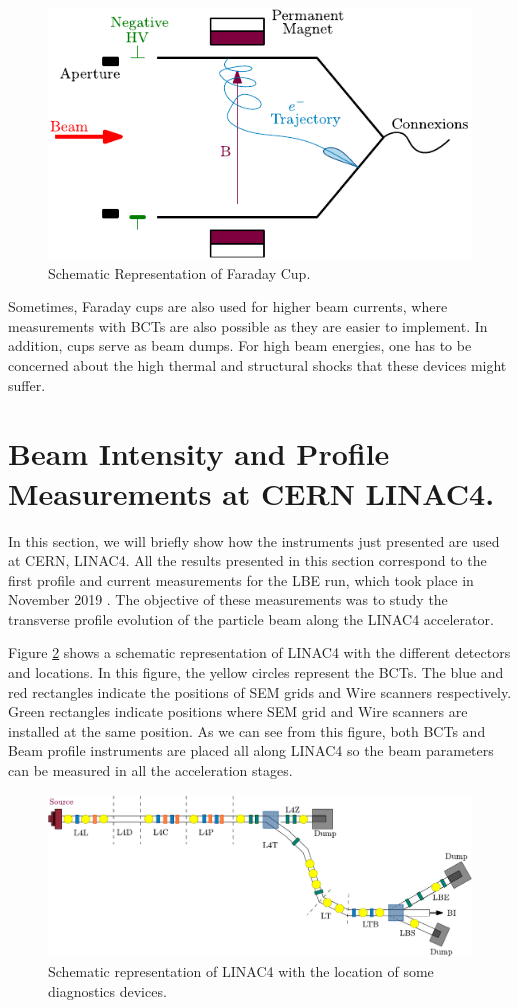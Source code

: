 \begin{figure}[h]
    \centering
    \includegraphics[width=0.6\columnwidth]{FCschema/FCschema.pdf}
    \caption{Schematic Representation of Faraday Cup. }
    \label{fig:FaradayCup}
\end{figure}

Sometimes, Faraday cups are also used for higher beam currents, where measurements with BCTs are also possible as they are easier to implement. In addition, cups serve as beam dumps. For high beam energies, one has to be concerned about the high thermal and structural shocks that these devices might suffer.

\section{Beam Intensity and Profile Measurements at CERN LINAC4.}

In this section, we will briefly show how the instruments just presented are used at CERN, LINAC4. All the results presented in this section correspond to the first profile and current measurements for the LBE run, which took place in November 2019 \parencite*[][]{ref:PresentationLBERun}. The objective of these measurements was to study the transverse profile evolution of the particle beam along the LINAC4 accelerator. 

Figure \ref{fig:Linac4Layout} shows a schematic representation of LINAC4 with the different detectors and locations. In this figure, the yellow circles represent the BCTs. The blue and red rectangles indicate the positions of SEM grids and Wire scanners respectively. Green rectangles indicate positions where SEM grid and Wire scanners are installed at the same position. As we can see from this figure, both BCTs and Beam profile instruments are placed all along LINAC4 so the beam parameters can be measured in all the acceleration stages. 

\begin{figure}[h]
    \centering
    \includegraphics[width=1.0\columnwidth]{Linac4Instrumetnation/Linac4Instruments.pdf}
    \caption{Schematic representation of LINAC4 with the location of some diagnostics devices.}
    \label{fig:Linac4Layout}
\end{figure}

